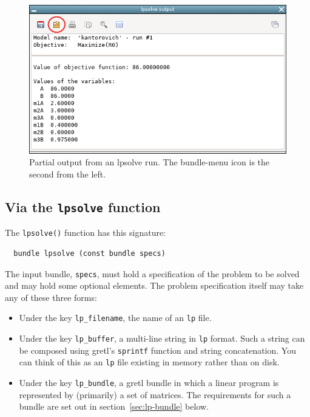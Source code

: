 \documentclass{article}
\begin{document}
\begin{figure}[p]
  \centering
  \includegraphics[scale=0.7]{figures/kantor-run}
  \caption{Partial output from an \textsf{lpsolve} run. The
    bundle-menu icon is the second from the left.}
  \label{fig:kantor2}
\end{figure}

\subsection{Via the \texttt{lpsolve} function}

The \texttt{lpsolve()} function has this signature:
\begin{verbatim}
  bundle lpsolve (const bundle specs)
\end{verbatim}

The input bundle, \texttt{specs}, must hold a specification of the
problem to be solved and may hold some optional elements.  The
problem specification itself may take any of these three forms:
\begin{itemize}
\item Under the key \texttt{lp\_filename}, the name of an \texttt{lp}
  file.
\item Under the key \texttt{lp\_buffer}, a multi-line string in
  \texttt{lp} format. Such a string can be composed using gretl's
  \texttt{sprintf} function and string concatenation. You can think of
  this as an \texttt{lp} file existing in memory rather than on disk.
\item Under the key \texttt{lp\_bundle}, a gretl bundle in which a
  linear program is represented by (primarily) a set of matrices. The
  requirements for such a bundle are set out in
  section~\ref{sec:lp-bundle} below.
\end{itemize}
\end{document}

